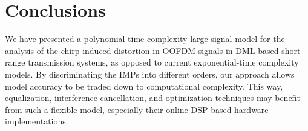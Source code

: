 \documentclass[journal]{IEEEtran}
\begin{document}
\section{Conclusions} \label{sec:conclusion}
We have presented a polynomial-time complexity large-signal model for the analysis of the chirp-induced distortion in OOFDM signals in DML-based short-range transmission systems, as opposed to current exponential-time complexity models. By discriminating the IMPs into different orders, our approach allows model accuracy to be traded down to computational complexity. This way, equalization, interference cancellation, and optimization techniques may benefit from such a flexible model, especially their online DSP-based hardware implementations. 


\end{document}
